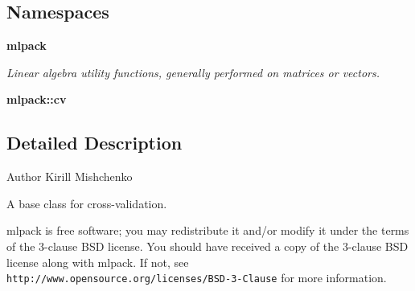 \subsection*{Namespaces}
\begin{DoxyCompactItemize}
\item 
 \textbf{ mlpack}
\begin{DoxyCompactList}\small\item\em Linear algebra utility functions, generally performed on matrices or vectors. \end{DoxyCompactList}\item 
 \textbf{ mlpack\+::cv}
\end{DoxyCompactItemize}


\subsection{Detailed Description}
\begin{DoxyAuthor}{Author}
Kirill Mishchenko
\end{DoxyAuthor}
A base class for cross-\/validation.

mlpack is free software; you may redistribute it and/or modify it under the terms of the 3-\/clause B\+SD license. You should have received a copy of the 3-\/clause B\+SD license along with mlpack. If not, see {\tt http\+://www.\+opensource.\+org/licenses/\+B\+S\+D-\/3-\/\+Clause} for more information. 